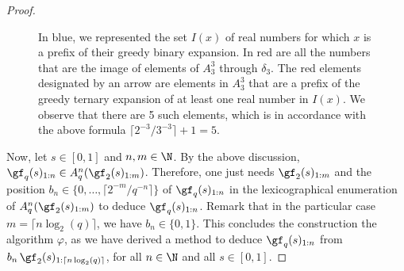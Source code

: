 \begin{proof}
\begin{figure}[H]
	\caption{In blue, we represented the set $I(x)$ of real numbers for which $x$ is a prefix of their greedy binary expansion. In red are all the numbers that are the image of elements of $A_3^3$ through $\delta_3$. The red elements designated by an arrow are elements in $A_3^3$ that are a prefix of the greedy ternary expansion of at least one real number in $I(x)$. We observe that there are 5 such elements, which is in accordance with the above formula $\lceil 2^{-3}/3^{-3} \rceil + 1 = 5$.}
\end{figure}

Now, let $s \in [0,1]$ and $n,m \in \N$. By the above discussion, $\gf_q(s)_{1:n} \in A_q^n(\gf_2(s)_{1:m})$. Therefore, one just needs $\gf_2(s)_{1:m}$ and the position $b_n \in \{0, \ldots, \lceil 2^{-m}/q^{-n} \rceil \}$ of $\gf_q(s)_{1:n}$ in the lexicographical enumeration of $A_q^n(\gf_2(s)_{1:m})$ to deduce $\gf_q(s)_{1:n}$. Remark that in the particular case $m = \lceil n \log_2(q)\rceil$, we have $b_n \in \{0, 1\}$. This concludes the construction the algorithm $\varphi$, as we have derived a method to deduce $\gf_q(s)_{1:n}$ from $b_n \, \gf_2(s)_{1:\lceil n \log_2(q)\rceil}$, for all $n \in \N$ and all $s \in [0,1]$.


\end{proof}

